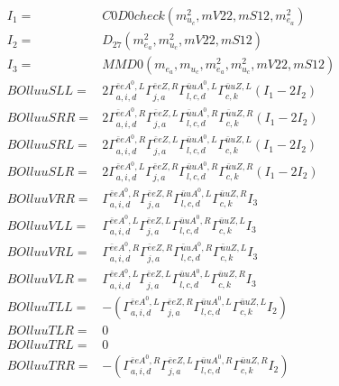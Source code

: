\documentclass[A4,landscape]{article}
\begin{document}
\begin{align} 
I_1 = & C0D0check(m^2_{u_{{c}}}, mV22, mS12, m^2_{e_{{a}}}) \\ 
I_2 = & D_{27}(m^2_{e_{{a}}}, m^2_{u_{{c}}}, mV22, mS12) \\ 
I_3 = & MMD0(m_{e_{{a}}}, m_{u_{{c}}}, m^2_{e_{{a}}}, m^2_{u_{{c}}}, mV22, mS12) \\ 
  BOlluuSLL= & 2  \Gamma^{\bar{e}e A^0 ,L}_{a, i, d} \Gamma^{\bar{e}e Z ,R}_{j, a} \Gamma^{\bar{u}u A^0 ,L}_{l, c, d} \Gamma^{\bar{u}u Z ,L}_{c, k} (I_1 - 2 I_2) \\ 
  BOlluuSRR= & 2  \Gamma^{\bar{e}e A^0 ,R}_{a, i, d} \Gamma^{\bar{e}e Z ,L}_{j, a} \Gamma^{\bar{u}u A^0 ,R}_{l, c, d} \Gamma^{\bar{u}u Z ,R}_{c, k} (I_1 - 2 I_2) \\ 
  BOlluuSRL= & 2  \Gamma^{\bar{e}e A^0 ,R}_{a, i, d} \Gamma^{\bar{e}e Z ,L}_{j, a} \Gamma^{\bar{u}u A^0 ,L}_{l, c, d} \Gamma^{\bar{u}u Z ,L}_{c, k} (I_1 - 2 I_2) \\ 
  BOlluuSLR= & 2  \Gamma^{\bar{e}e A^0 ,L}_{a, i, d} \Gamma^{\bar{e}e Z ,R}_{j, a} \Gamma^{\bar{u}u A^0 ,R}_{l, c, d} \Gamma^{\bar{u}u Z ,R}_{c, k} (I_1 - 2 I_2) \\ 
  BOlluuVRR= &  \Gamma^{\bar{e}e A^0 ,R}_{a, i, d} \Gamma^{\bar{e}e Z ,R}_{j, a} \Gamma^{\bar{u}u A^0 ,L}_{l, c, d} \Gamma^{\bar{u}u Z ,R}_{c, k} I_3 \\ 
  BOlluuVLL= &  \Gamma^{\bar{e}e A^0 ,L}_{a, i, d} \Gamma^{\bar{e}e Z ,L}_{j, a} \Gamma^{\bar{u}u A^0 ,R}_{l, c, d} \Gamma^{\bar{u}u Z ,L}_{c, k} I_3 \\ 
  BOlluuVRL= &  \Gamma^{\bar{e}e A^0 ,R}_{a, i, d} \Gamma^{\bar{e}e Z ,R}_{j, a} \Gamma^{\bar{u}u A^0 ,R}_{l, c, d} \Gamma^{\bar{u}u Z ,L}_{c, k} I_3 \\ 
  BOlluuVLR= &  \Gamma^{\bar{e}e A^0 ,L}_{a, i, d} \Gamma^{\bar{e}e Z ,L}_{j, a} \Gamma^{\bar{u}u A^0 ,L}_{l, c, d} \Gamma^{\bar{u}u Z ,R}_{c, k} I_3 \\ 
  BOlluuTLL= & -( \Gamma^{\bar{e}e A^0 ,L}_{a, i, d} \Gamma^{\bar{e}e Z ,R}_{j, a} \Gamma^{\bar{u}u A^0 ,L}_{l, c, d} \Gamma^{\bar{u}u Z ,L}_{c, k} I_2) \\ 
  BOlluuTLR= & 0 \\ 
  BOlluuTRL= & 0 \\ 
  BOlluuTRR= & -( \Gamma^{\bar{e}e A^0 ,R}_{a, i, d} \Gamma^{\bar{e}e Z ,L}_{j, a} \Gamma^{\bar{u}u A^0 ,R}_{l, c, d} \Gamma^{\bar{u}u Z ,R}_{c, k} I_2) \\ 
\end{align} 
\end{document}
